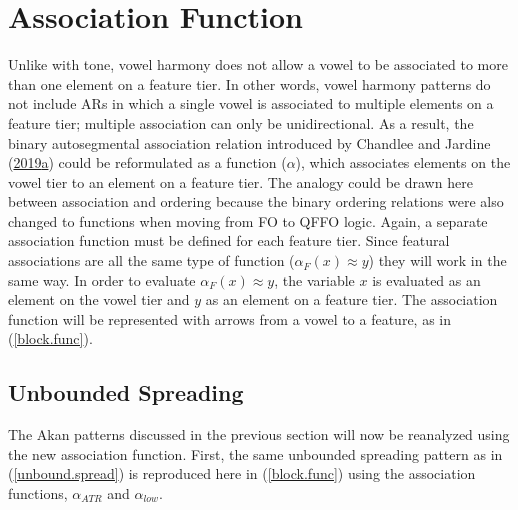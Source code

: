 \documentclass[,doc,floatsintext]{apa6}
\theoremstyle{definition}
\theoremstyle{definition}
\theoremstyle{definition}
\theoremstyle{remark}
\begin{document}
\section{Association Function}\label{association-function}

Unlike with tone, vowel harmony does not allow a vowel to be associated
to more than one element on a feature tier. In other words, vowel
harmony patterns do not include ARs in which a single vowel is
associated to multiple elements on a feature tier; multiple association
can only be unidirectional. As a result, the binary autosegmental
association relation introduced by Chandlee and Jardine
(\protect\hyperlink{ref-chandleejardineaisl}{2019}\protect\hyperlink{ref-chandleejardineaisl}{a})
could be reformulated as a function (\(\alpha\)), which associates
elements on the vowel tier to an element on a feature tier. The analogy
could be drawn here between association and ordering because the binary
ordering relations were also changed to functions when moving from FO to
QFFO logic. Again, a separate association function must be defined for
each feature tier. Since featural associations are all the same type of
function (\(\alpha_F(x)\approx y\)) they will work in the same way. In
order to evaluate \(\alpha_F(x)\approx y\), the variable \(x\) is
evaluated as an element on the vowel tier and \(y\) as an element on a
feature tier. The association function will be represented with arrows
from a vowel to a feature, as in (\ref{block.func}).

\subsection{Unbounded Spreading}\label{unbounded-spreading-1}

The Akan patterns discussed in the previous section will now be
reanalyzed using the new association function. First, the same unbounded
spreading pattern as in (\ref{unbound.spread}) is reproduced here in
(\ref{block.func}) using the association functions, \(\alpha_{ATR}\) and
\(\alpha_{low}\).
\end{document}

